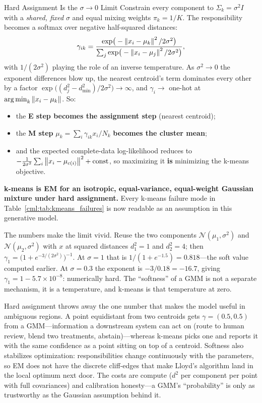 \begin{mathresult}{Hard Assignment Is the $\sigma \to 0$ Limit}
Constrain every component to $\Sigma_k = \sigma^2 I$ with a \emph{shared, fixed} $\sigma$ and equal mixing weights $\pi_k = 1/K$. The responsibility becomes a softmax over negative half-squared distances:
\begin{equation}
\gamma_{ik} = \frac{\exp\!\big(-\left\lVert x_i - \mu_k\right\rVert^2 / 2\sigma^2\big)}{\sum_j \exp\!\big(-\left\lVert x_i - \mu_j\right\rVert^2 / 2\sigma^2\big)},
\end{equation}
with $1/(2\sigma^2)$ playing the role of an inverse temperature. As $\sigma^2 \to 0$ the exponent differences blow up, the nearest centroid's term dominates every other by a factor $\exp\!\big((d_j^2 - d_{\min}^2)/2\sigma^2\big) \to \infty$, and $\gamma_i \to$ one-hot at $\operatorname*{arg\,min}_k \left\lVert x_i - \mu_k\right\rVert$. So:
\begin{itemize}
    \item the \textbf{E step becomes the assignment step} (nearest centroid);
    \item the \textbf{M step} $\mu_k = \sum_i \gamma_{ik}x_i / N_k$ \textbf{becomes the cluster mean};
    \item and the expected complete-data log-likelihood reduces to $-\frac{1}{2\sigma^2}\sum_i \left\lVert x_i - \mu_{c(i)}\right\rVert^2 + \text{const}$, so maximizing it \textbf{is} minimizing the k-means objective.
\end{itemize}
\textbf{k-means is EM for an isotropic, equal-variance, equal-weight Gaussian mixture under hard assignment.} Every k-means failure mode in Table~\ref{cml:tab:kmeans_failures} is now readable as an assumption in this generative model.
\end{mathresult}

The numbers make the limit vivid. Reuse the two components $\mathcal{N}(\mu_1, \sigma^2)$ and $\mathcal{N}(\mu_2, \sigma^2)$ with $x$ at squared distances $d_1^2 = 1$ and $d_2^2 = 4$; then $\gamma_1 = \big(1 + e^{-3/(2\sigma^2)}\big)^{-1}$. At $\sigma = 1$ that is $1/(1+e^{-1.5}) = 0.818$---the soft value computed earlier. At $\sigma = 0.3$ the exponent is $-3/0.18 = -16.7$, giving $\gamma_1 = 1 - 5.7\times10^{-8}$: numerically hard. The ``softness'' of a GMM is not a separate mechanism, it is a temperature, and k-means is that temperature at zero.

\begin{keyinsight}
Hard assignment throws away the one number that makes the model useful in ambiguous regions. A point equidistant from two centroids gets $\gamma = (0.5, 0.5)$ from a GMM---information a downstream system can act on (route to human review, blend two treatments, abstain)---whereas k-means picks one and reports it with the same confidence as a point sitting on top of a centroid. Softness also stabilizes optimization: responsibilities change continuously with the parameters, so EM does not have the discrete cliff-edges that make Lloyd's algorithm land in the local optimum next door. The costs are compute ($d^2$ per component per point with full covariances) and calibration honesty---a GMM's ``probability'' is only as trustworthy as the Gaussian assumption behind it.
\end{keyinsight}


